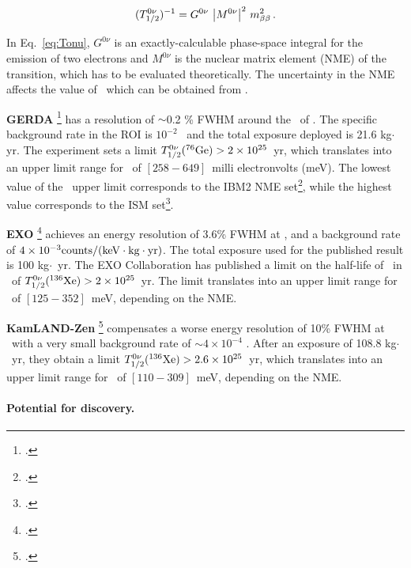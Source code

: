 \begin{equation}
(T^{0\nu}_{1/2})^{-1} = G^{0\nu} \ \big|M^{0\nu}\big|^{2} \ \mbb^{2} \, .
\label{eq:Tonu}
\end{equation}

In Eq.~\ref{eq:Tonu}, $G^{0\nu}$ is an exactly-calculable phase-space integral for the emission of two electrons and $M^{0\nu}$ is the nuclear matrix element (NME) of the transition, which has to be evaluated theoretically. The uncertainty in the NME affects the value of \mbb\ which can be obtained from \Tonu.
 
{\bf GERDA} \footcite{Agostini:2013mzu} has a resolution of $\sim$0.2 \% FWHM around the \Qbb\ of \GE. The specific background rate in the ROI is $10^{-2}$ \ckky\ and the total exposure deployed is 21.6 kg$\cdot$yr. The experiment sets a limit $T_{1/2}^{0\nu}({}^{76}\rm Ge)> 2 \times 10^{25}$~yr, which translates into an upper limit range for \mbb\ of $[258-649]$~milli electronvolts (meV). The lowest value of the \mbb\ upper limit corresponds to the IBM2 NME set\footcite{Barea:2013bz}, while the highest value corresponds to the ISM set\footcite{Menendez:2008jp}.

{\bf EXO} \footcite{Albert:2014awa} achieves an energy resolution of 3.6\% FWHM at \Qbb, and a background rate of $ 4 \times 10^{-3}\rm counts/(keV \cdot kg \cdot yr)$. The total exposure used for the published result is 100 kg$\cdot$~yr. The EXO Collaboration has published a limit on the half-life of \bbonu\ in \XE\ of $T_{1/2}^{0\nu}({}^{136}\rm Xe) > 2 \times 10^{25}$~yr. The limit translates into an upper limit range for \mbb\ of $[125-352]$~meV, depending on the NME.

{\bf KamLAND-Zen} \footcite{TheKamLAND-Zen:2014lma} compensates a worse energy resolution of 10\% FWHM at \Qbb\ with a very small background rate of $\sim 4 \times 10^{-4}$ \ckky. After an exposure of 108.8 kg$\cdot$~yr, they obtain a limit  $T_{1/2}^{0\nu}({}^{136}\rm Xe) > 2.6 \times 10^{25}$~yr, which translates into an upper limit range for \mbb\ of $[110-309]$~meV, depending on the NME.

 \paragraph{Potential for discovery.}
 

